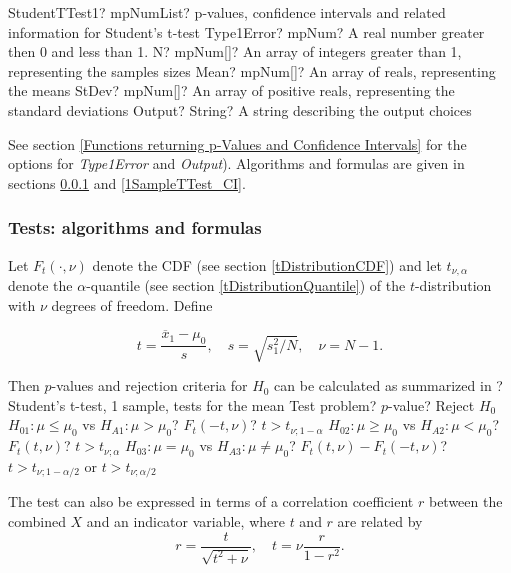 \begin{mpFunctionsExtract}
	\mpFunctionFiveNotImplemented
	{StudentTTest1? mpNumList? p-values, confidence intervals and related information for Student's t-test}
	{Type1Error? mpNum? A real number greater then 0 and less than 1.}
	{N? mpNum[]? An array of integers greater than 1, representing the samples sizes}
	{Mean? mpNum[]? An array of reals, representing the means}
	{StDev? mpNum[]? An array of positive reals, representing the standard deviations}
	{Output? String? A string describing the output choices}
\end{mpFunctionsExtract}

\vspace{0.3cm}
See section \ref{Functions returning p-Values and Confidence Intervals} for the options for {\itshape\sffamily Type1Error} and {\itshape\sffamily Output}). Algorithms and formulas are given in sections \ref{1SampleTTest_Test} and \ref{1SampleTTest_CI}.



\subsubsection{Tests: algorithms and formulas}
\label{1SampleTTest_Test}
Let $F_t\left(\cdot, \nu\right)$ denote the CDF (see section \ref{tDistributionCDF}) and let $t_{\nu,\alpha}$ denote the $\alpha$-quantile (see section \ref{tDistributionQuantile}) of the $t$-distribution with $\nu$ degrees of freedom. Define

\begin{equation} \label{eq:TTest1}
	t= \frac{\overline{x}_1-\mu_0}{s}, \quad s=\sqrt{s_1^2 /N}, \quad \nu=N-1.
\end{equation}


\mpTableThreeColsThreeRows
{Then $p$-values and rejection criteria for $H_0$ can be calculated as summarized in ? Student's t-test, 1 sample, tests for the mean}
{Test problem? $p$-value? Reject $H_0$}
{$H_{01}: \mu \leq \mu_0$ vs $H_{A1}: \mu > \mu_0$? $F_t\left(-t, \nu\right)$? $t > t_{\nu;1-\alpha}$}
{$H_{02}: \mu \geq \mu_0$ vs $H_{A2}: \mu < \mu_0$? $F_t\left(t, \nu\right)$? $t > t_{\nu;\alpha}$}
{$H_{03}: \mu = \mu_0$ vs $H_{A3}: \mu \neq \mu_0$? $F_t\left(t, \nu\right)-F_t\left(-t, \nu\right)$? $t > t_{\nu;1-\alpha/2}$ or $t > t_{\nu;\alpha/2}$}



The test can also be expressed in terms of a correlation coefficient $r$ between the combined $X$ and an indicator variable, where $t$ and $r$ are related by
\begin{equation}
	r=\frac{t}{\sqrt{t^2+\nu}}, \quad t= \nu \frac{r}{1-r^2}.
\end{equation}



